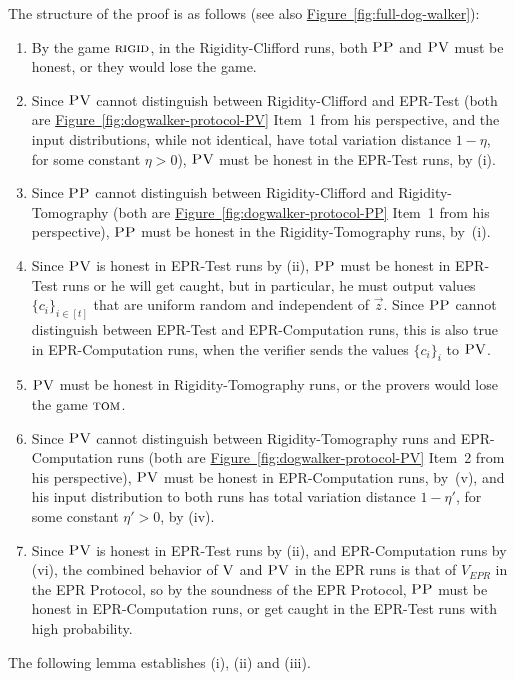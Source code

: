 \documentclass[11pt]{article}
\numberwithin{equation}{section}
\theoremstyle{definition}
\theoremstyle{plain}
\newcommand{\expref}[2]{\hyperref[#2]{#1~\ref{#2}}}
\newcommand{\rigid}{\textsc{rigid}}
\newcommand{\tom}{\textsc{tom}}
\newcommand{\ver}{\textsc{V}}
\newcommand{\pv}{\textsc{PV}}
\newcommand{\pp}{\textsc{PP}}
\begin{document}
\noindent The structure of the proof is as follows (see also \expref{Figure}{fig:full-dog-walker}):
\begin{enumerate}
\item[(i)] By the game $\rigid$, in the Rigidity-Clifford runs, both $\pp$ and $\pv$ must be honest, or they would lose the game.
\item[(ii)] Since $\pv$ cannot distinguish between Rigidity-Clifford and EPR-Test (both are \expref{Figure}{fig:dogwalker-protocol-PV} Item~1 from his perspective, and the input distributions, while not identical, have total variation distance $1 - \eta$, for some constant $\eta > 0$), $\pv$ must be honest in the EPR-Test runs, by (i). 
\item[(iii)] Since $\pp$ cannot distinguish between Rigidity-Clifford and Rigidity-Tomography (both are \expref{Figure}{fig:dogwalker-protocol-PP} Item~1 from his perspective), $\pp$ must be honest in the Rigidity-Tomography runs, by~(i). 
\item[(iv)] Since $\pv$ is honest in EPR-Test runs by (ii), $\pp$ must be honest in EPR-Test runs or he will get caught, but in particular, he must output values $\{c_i\}_{i\in [t]}$ that are uniform random and independent of $\vec{z}$. Since $\pp$ cannot distinguish between EPR-Test and EPR-Computation runs, this is also true in EPR-Computation runs, when the verifier sends the values $\{c_i\}_i$ to $\pv$. 
\item[(v)] $\pv$ must be honest in Rigidity-Tomography runs, or the provers would lose the game $\tom$.
\item[(vi)] Since $\pv$ cannot distinguish between Rigidity-Tomography runs and EPR-Computation runs (both are \expref{Figure}{fig:dogwalker-protocol-PV} Item~2 from his perspective), $\pv$ must be honest in EPR-Computation runs, by~(v), and his input distribution to both runs has total variation distance $1 - \eta'$, for some constant $\eta' > 0$, by (iv).
\item[(vii)] Since $\pv$ is honest in EPR-Test runs by (ii), and EPR-Computation runs by (vi), the combined behavior of $\ver$ and $\pv$ in the EPR runs is that of $V_{EPR}$ in the EPR Protocol, so
by the soundness of the EPR Protocol, $\pp$ must be honest in EPR-Computation runs, or get caught in the EPR-Test runs with high probability.
\end{enumerate}

 The following lemma establishes (i), (ii) and (iii). 
\end{document}
